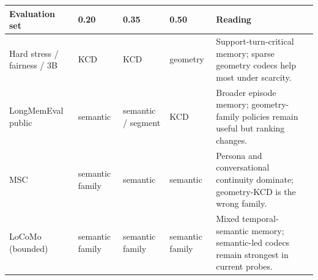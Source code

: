 \begin{tabular}{p{2.15cm}p{1.4cm}p{1.4cm}p{1.4cm}p{2.9cm}}
\toprule
Evaluation set & 0.20 & 0.35 & 0.50 & Reading \\
\midrule
Hard stress / fairness / 3B & KCD & KCD & geometry & Support-turn-critical memory; sparse geometry codecs help most under scarcity. \\
LongMemEval public & semantic & semantic / segment & KCD & Broader episode memory; geometry-family policies remain useful but ranking changes. \\
MSC & semantic family & semantic & semantic & Persona and conversational continuity dominate; geometry-KCD is the wrong family. \\
LoCoMo (bounded) & semantic family & semantic family & semantic family & Mixed temporal-semantic memory; semantic-led codecs remain strongest in current probes. \\
\bottomrule
\end{tabular}